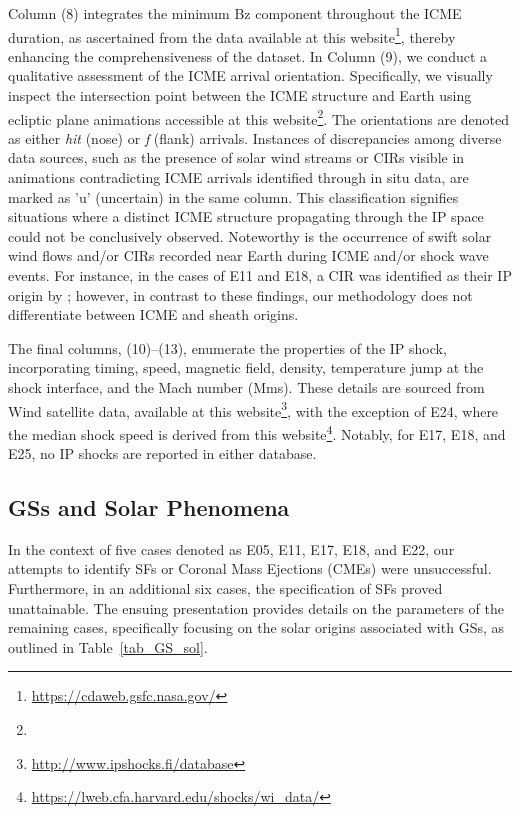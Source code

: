 Column (8) integrates the minimum Bz component throughout the ICME duration, as ascertained from the data available at this website\footnote{\url{https://cdaweb.gsfc.nasa.gov/}}, thereby enhancing the comprehensiveness of the dataset. In Column (9), we conduct a qualitative assessment of the ICME arrival orientation. Specifically, we visually inspect the intersection point between the ICME structure and Earth using ecliptic plane animations accessible at this website\footnote{\helioweatherurl}. The orientations are denoted as either \textit{hit} (nose) or \textit{f} (flank) arrivals. Instances of discrepancies among diverse data sources, such as the presence of solar wind streams or CIRs visible in animations contradicting ICME arrivals identified through in situ data, are marked as 'u' (uncertain) in the same column. This classification signifies situations where a distinct ICME structure propagating through the IP space could not be conclusively observed. Noteworthy is the occurrence of swift solar wind flows and/or CIRs recorded near Earth during ICME and/or shock wave events. For instance, in the cases of E11 and E18, a CIR was identified as their IP origin by \citet{qiu_2022}; however, in contrast to these findings, our methodology does not differentiate between ICME and sheath origins.

The final columns, (10)–(13), enumerate the properties of the IP shock, incorporating timing, speed, magnetic field, density, temperature jump at the shock interface, and the Mach number (Mms). These details are sourced from Wind satellite data, available at this website\footnote{\url{http://www.ipshocks.fi/database}}, with the exception of E24, where the median shock speed is derived from this website\footnote{\url{https://lweb.cfa.harvard.edu/shocks/wi_data/}}. Notably, for E17, E18, and E25, no IP shocks are reported in either database.

\subsection{GSs and Solar Phenomena}
In the context of five cases denoted as E05, E11, E17, E18, and E22, our attempts to identify SFs or Coronal Mass Ejections (CMEs) were unsuccessful. Furthermore, in an additional six cases, the specification of SFs proved unattainable. The ensuing presentation provides details on the parameters of the remaining cases, specifically focusing on the solar origins associated with GSs, as outlined in Table~\ref{tab_GS_sol}.

